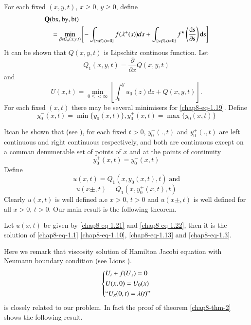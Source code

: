 For each fixed $(x,y,t)$, $x \geq 0$, $y\geq 0$, define
\begin{align}\label{chap8-eq-1.17}
&\mathbf{Q}(\operatorname{bx}, \operatorname{by}, \operatorname{bt})\nonumber\\
&\quad = \min\limits_{\beta \epsilon \mathcal{C}_{\alpha}(x,y,t)}\left[-\int_{\{s:\beta(s)=0\}} f(\lambda^{+}(s))ds + \int_{\{s:\beta(s)>0\}}f^{\star}\left(\dfrac{\rm{ds}}{\partial{\rm s}}\right){\rm ds}\right]
\end{align}
It can be shown that $Q(x,y,t)$ is Lipschitz continous function. Let
\begin{equation}\label{chap8-eq-1.18}
Q_{1}(x,y,t)= \dfrac{\partial}{\partial x}Q(x,y,t)
\end{equation} 
and
\begin{equation}\label{chap8-eq-1.19}
U(x, t) = \min\limits_{0 \leq < \infty}\left[\int_{0}^{y}u_{0}(z)dz + Q(x,y,t)\right].
\end{equation}
For each fixed $(x,t)$ there may be several minimisers for \eqref{chap8-eq-1.19}. Define
\begin{equation}\label{chap8-eq-1.20}
y_{0}^{-}(x, t) =\min\{y_{0}(x,t)\}, y_{0}^{+}(x,t)=\max\{y_{0}(x,t)\}
\end{equation}

It\pageoriginale can be shown  that (see \cite{chap8-key5}), for each fixed $t> 0$, $y_{0}^{-}(.,t)$ and $y_{0}^{+}(.,t)$ are left continuous and right continuous respectively, and both are continuous except on a comman denumerable set of points of $x$ and at the points of continuity
$$
y_{0}^{+}(x, t)= y_{0}^{-}(x,t)
$$ 
Define
\begin{equation}\label{chap8-eq-1.21}
u(x,t)=Q_{1}(x, y_{0}(x,t),t)\; \text{and}
\end{equation}
\begin{equation}\label{chap8-eq-1.22}
u(x \pm, t) =Q_{1}(x,y_{0}^{\pm}(x,t),t)
\end{equation}
Clearly $u(x,t)$ is well defined a.e $x>0$, $t>0$ and $u(x\pm, t)$ is well defined for all $x>0$, $t>0$. Our main result is the following theorem.

\begin{thm}\label{chap8-thm-2}
Let $u(x,t)$ be given by \eqref{chap8-eq-1.21} and \eqref{chap8-eq-1.22}, then it is the solution of \eqref{chap8-eq-1.1}
\eqref{chap8-eq-1.10}, \eqref{chap8-eq-1.13} and \eqref{chap8-eq-1.3}. 
\end{thm}
 Here we remark that viscosity solution of Hamilton Jacobi equation with Neumann boundary condition (see Lions \cite{chap8-key11, chap8-key12}).
 \begin{equation}\label{chap8-eq-1.23}
 \left\{
\begin{aligned}
&U_{t}+ f(U_{x})=0\\
&U(x, 0) =U_{0}(x)\\
&``U_{x}(0,t)= \lambda(t)"
\end{aligned}
\right.
 \end{equation}
is closely related to our problem. In fact the proof of theorem \ref{chap8-thm-2} shows the following result.

